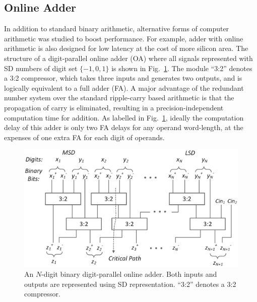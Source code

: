 \documentclass[10pt, conference, compsocconf]{IEEEtran}
\begin{document}

\subsection{Online Adder}\label{subsec:online_adder}
In addition to standard binary arithmetic, alternative forms of computer arithmetic was studied to boost performance. For example, adder with online arithmetic is also designed for low latency at the cost of more silicon area. The structure of a digit-parallel online adder (OA) where all signals represented with SD numbers of digit set $\{-1,0,1\}$ is shown in Fig.~\ref{Fig:Radix2SD_adder}. The module ``3:2'' denotes a 3:2 compressor, which takes three inputs and generates two outputs, and is logically equivalent to a full adder (FA). A major advantage of the redundant number system over the standard ripple-carry based arithmetic is that the propagation of carry is eliminated, resulting in a precision-independent computation time for addition. As labelled in Fig.~\ref{Fig:Radix2SD_adder}, ideally the computation delay of this adder is only two FA delays for any operand word-length, at the expenses of one extra FA for each digit of operands. 
%
\begin{figure}[tbp]
  \centering
  \includegraphics[width=.45\textwidth]{./figures/SDAdder.eps}
  \caption{An $N$-digit binary digit-parallel online adder. Both inputs and outputs are represented using SD representation. ``3:2'' denotes a 3:2 compressor.}
  \label{Fig:Radix2SD_adder}
\end{figure}
\end{document}
